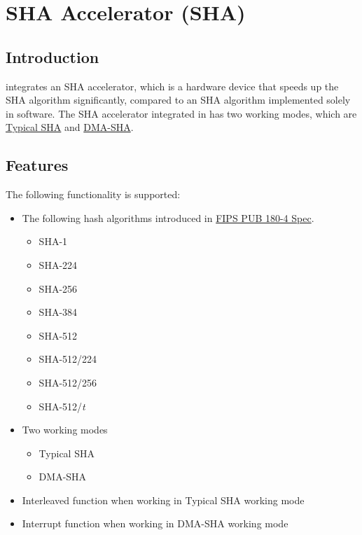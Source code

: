 \documentclass[main\_\_EN.tex]{subfiles}
\begin{document}

\ifglobal
\else
    {\let\clearpage\relax \listoftodos}
    {\let\clearpage\relax \listofdonetodos}
    \tableofcontents
\fi











\hypertarget{sha}{}
\chapter{SHA Accelerator (SHA)}
\label{mod:sha}
\section{Introduction}

\chipname{} integrates an SHA accelerator, which is a hardware device that speeds up the SHA algorithm significantly, compared to an SHA algorithm implemented solely in software. The SHA accelerator integrated in \chipname{} has two working modes, which are  \hyperref[sec:sha-typical-sha]{Typical SHA} and  \hyperref[sec:sha-dma-sha]{DMA-SHA}.

\section{Features}

The following functionality is supported:

\begin{itemize}
    \item The following hash algorithms introduced in   \href{https://doi.org/10.6028/NIST.FIPS.180-4}{FIPS PUB 180-4 Spec}.
    \begin{itemize}
        \item SHA-1
        \item SHA-224
        \item SHA-256
        \item SHA-384
        \item SHA-512
        \item SHA-512/224
        \item SHA-512/256
        \item SHA-512/{\it{t}}
    \end{itemize}
    \item Two working modes
    \begin{itemize}
        \item Typical SHA
        \item DMA-SHA
    \end{itemize}
    \item Interleaved function when working in Typical SHA working mode
    \item Interrupt function when working in DMA-SHA working mode
\end{itemize}
\end{document}
